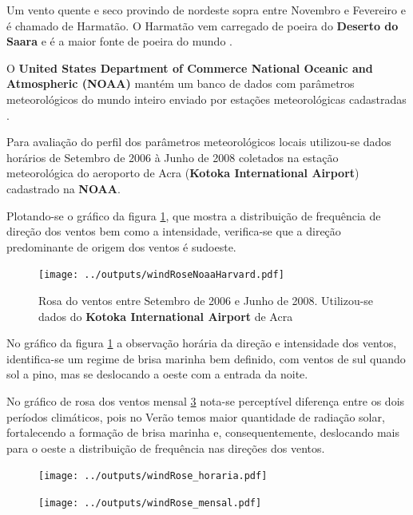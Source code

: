 Um vento quente e seco provindo de nordeste sopra entre Novembro e Fevereiro 
e é chamado de Harmatão. O Harmatão vem carregado de poeira do 
\textbf{Deserto do Saara} e é a maior fonte de poeira do mundo
\citep{breuning2005}.

O \textbf{United States Department of Commerce National Oceanic 
and Atmospheric (NOAA)} mantém um banco de dados com parâmetros 
meteorológicos do mundo inteiro enviado por estações meteorológicas 
cadastradas \citep{noaa}. 

Para avaliação do perfil dos parâmetros meteorológicos locais
utilizou-se dados horários de Setembro de 2006 à Junho de 2008 
coletados na estação meteorológica do aeroporto de Acra 
(\textbf{Kotoka International Airport}) cadastrado na \textbf{NOAA}.

Plotando-se o gráfico da figura \ref{fg:rosaCompleta}, 
que mostra a distribuição de frequência de direção dos ventos bem como a 
intensidade, verifica-se que a direção predominante de origem dos ventos 
é sudoeste. 

\begin{figure}[H]
  \centering
  \texttt{[image: ../outputs/windRoseNoaaHarvard.pdf]}
  \caption{Rosa do ventos entre
           Setembro de 2006 e Junho de 2008. Utilizou-se dados 
           do \textbf{Kotoka International Airport} de Acra 
           \label{fg:rosaCompleta}}
\end{figure}

No gráfico da figura \ref{fg:rosaCompleta} a observação horária da direção e 
intensidade dos ventos, identifica-se um regime de brisa marinha bem 
definido, com ventos de sul quando sol a pino, mas se deslocando a oeste com a 
entrada da noite. 

No gráfico de rosa dos ventos mensal \ref{fig:windRose_mensal} nota-se 
perceptível diferença entre os dois períodos climáticos, 
pois no Verão temos maior quantidade de radiação solar, fortalecendo a 
formação de brisa marinha e, consequentemente, deslocando mais para o 
oeste a distribuição de frequência nas direções dos ventos.

\begin{figure}[H]
  \centering
  \texttt{[image: ../outputs/windRose\_horaria.pdf]}
  \caption{ \citep{carslaw2012} \label{fig:windRose_horaria}}
\end{figure}

\begin{figure}[H]
  \centering
  \texttt{[image: ../outputs/windRose\_mensal.pdf]}
  \caption{ \citep{carslaw2012} \label{fig:windRose_mensal}}
\end{figure}

